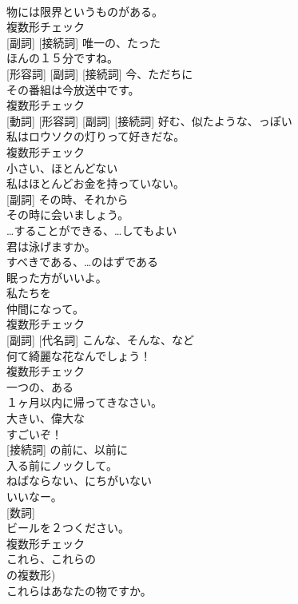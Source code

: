 \documentclass[8pt]{extreport}
\begin{document}
\begin{CJK}{UTF8}{min}
\\	物には限界というものがある。	
\\	複数形チェック
\\	[形容詞] [副詞] [接続詞]	唯一の、たった	
\\	ほんの１５分ですね。	
\\	[名詞] [形容詞] [副詞] [接続詞]	今、ただちに	
\\	その番組は今放送中です。	
\\	複数形チェック
\\	[名詞] [動詞] [形容詞] [副詞] [接続詞]	好む、似たような、っぽい	
\\	私はロウソクの灯りって好きだな。	
\\	複数形チェック
\\	[形容詞]	小さい、ほとんどない	
\\	私はほとんどお金を持っていない。	
\\	[形容詞] [副詞]	その時、それから	
\\	その時に会いましょう。	
\\	[助動詞]	…することができる、…してもよい	
\\	君は泳げますか。	
\\	[助動詞]	すべきである、…のはずである	
\\	眠った方がいいよ。	
\\	[代名詞]	私たちを	
\\	仲間になって。	
\\	複数形チェック
\\	[形容詞] [副詞] [代名詞]	こんな、そんな、など	
\\	何て綺麗な花なんでしょう！	
\\	複数形チェック
\\	[冠詞]	一つの、ある	
\\	１ヶ月以内に帰ってきなさい。	
\\	[形容詞]	大きい、偉大な	
\\	すごいぞ！	
\\	[前置詞] [接続詞]	の前に、以前に	
\\	入る前にノックして。	
\\	[助動詞]	ねばならない、にちがいない	
\\	いいなー。	
\\	[名詞] [数詞]	
\\	ビールを２つください。	
\\	複数形チェック
\\	[代名詞]	これら、これらの 
\\	の複数形)	
\\	これらはあなたの物ですか。	

\end{CJK}
\end{document}
